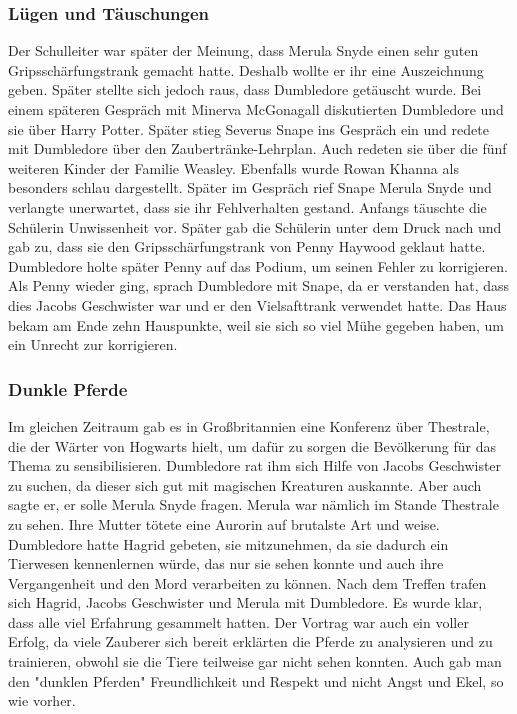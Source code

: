 \documentclass[a4paper, 10pt]{article}
\begin{document}
\subsubsection*{Lügen und Täuschungen}
Der Schulleiter war später der Meinung, dass Merula Snyde einen sehr guten Gripsschärfungstrank gemacht hatte. Deshalb wollte er ihr eine Auszeichnung geben. Später stellte sich jedoch raus, dass Dumbledore getäuscht wurde.
\vspace{10pt}
\newline
Bei einem späteren Gespräch mit Minerva McGonagall diskutierten Dumbledore und sie über Harry Potter. Später stieg Severus Snape ins Gespräch ein und redete mit Dumbledore über den Zaubertränke-Lehrplan. Auch redeten sie über die fünf weiteren Kinder der Familie Weasley. Ebenfalls wurde Rowan Khanna als besonders schlau dargestellt.
\vspace{10pt}
\newline
Später im Gespräch rief Snape Merula Snyde und verlangte unerwartet, dass sie ihr Fehlverhalten gestand. Anfangs täuschte die Schülerin Unwissenheit vor. Später gab die Schülerin unter dem Druck nach und gab zu, dass sie den Gripsschärfungstrank von Penny Haywood geklaut hatte. Dumbledore holte später Penny auf das Podium, um seinen Fehler zu korrigieren. Als Penny wieder ging, sprach Dumbledore mit Snape, da er verstanden hat, dass dies Jacobs Geschwister war und er den Vielsafttrank verwendet hatte. Das Haus bekam am Ende zehn Hauspunkte, weil sie sich so viel Mühe gegeben haben, um ein Unrecht zur korrigieren.
\subsubsection*{Dunkle Pferde}
Im gleichen Zeitraum gab es in Großbritannien eine Konferenz über Thestrale, die der Wärter von Hogwarts hielt, um dafür zu sorgen die Bevölkerung für das Thema zu sensibilisieren. Dumbledore rat ihm sich Hilfe von Jacobs Geschwister zu suchen, da dieser sich gut mit magischen Kreaturen auskannte. Aber auch sagte er, er solle Merula Snyde fragen. Merula war nämlich im Stande Thestrale zu sehen. Ihre Mutter tötete eine Aurorin auf brutalste Art und weise. Dumbledore hatte Hagrid gebeten, sie mitzunehmen, da sie dadurch ein Tierwesen kennenlernen würde, das nur sie sehen konnte und auch ihre Vergangenheit und den Mord verarbeiten zu können.
\vspace{10pt}
\newline
Nach dem Treffen trafen sich Hagrid, Jacobs Geschwister und Merula mit Dumbledore. Es wurde klar, dass alle viel Erfahrung gesammelt hatten. Der Vortrag war auch ein voller Erfolg, da viele Zauberer sich bereit erklärten die Pferde zu analysieren und zu trainieren, obwohl sie die Tiere teilweise gar nicht sehen konnten. Auch gab man den "dunklen Pferden" Freundlichkeit und Respekt und nicht Angst und Ekel, so wie vorher.
\end{document}
